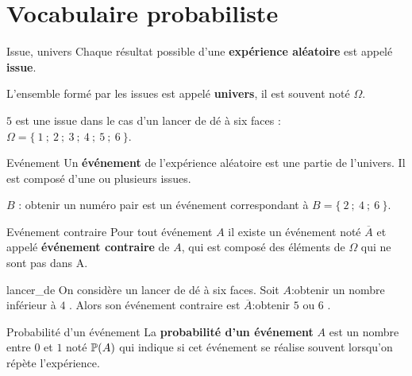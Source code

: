 \documentclass[10pt,a4paper,openany,twoside]{book}
\begin{document}
	\entetegal

\section{Vocabulaire probabiliste}

\begin{defi}{Issue, univers}{}
   Chaque résultat possible d'une \textbf{expérience aléatoire} est appelé \textbf{issue}.

   L'ensemble formé par les issues est appelé \textbf{univers}, il est souvent noté $\Omega$.
\end{defi}

\begin{ex}{}{}
   $5$ est une issue dans le cas d'un lancer de dé à six faces : $\Omega =\{~1~;~2~;~3~;~4~;~5~;~6~\}$.
\end{ex}

\begin{defi}{Evénement}{}
   Un \textbf{événement} de l'expérience aléatoire est une partie de l'univers. Il est composé d'une ou plusieurs issues.
\end{defi}

\begin{ex}{}{}
   $B$ : \og obtenir un numéro pair \fg{} est un événement correspondant à $B=\{~2~;~4~;~6~\}$.
\end{ex}

\begin{defi}{Evénement contraire}{}
   Pour tout événement $A$ il existe un événement noté $\overline{A}$ et appelé \textbf{événement contraire} de $A$, qui est composé des éléments de $\Omega$ qui ne sont pas dans A.
\end{defi}

\begin{ex}{}{lancer_de}
   On considère un lancer de dé à six faces. Soit $A$:\og obtenir un nombre inférieur à $4$ \fg{}. Alors son événement contraire est $\overline{A}$:\og obtenir $5$ ou $6$ \fg{}.
\end{ex}

\begin{defi}{Probabilité d'un événement}{}
   La \textbf{probabilité d'un événement} $A$ est un nombre entre $0$ et $1$ noté $\P(A)$ qui indique si cet événement se réalise souvent lorsqu'on répète l'expérience.
\end{defi}
\end{document}
